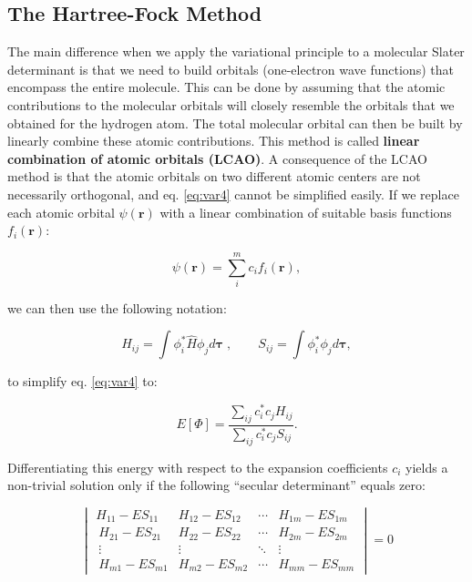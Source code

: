 \documentclass[
  9pt,
]{extbook}
\theoremstyle{definition}
\theoremstyle{definition}
\theoremstyle{definition}
\theoremstyle{remark}
\begin{document}
\hypertarget{the-hartree-fock-method}{%
\subsection{The Hartree-Fock Method}\label{the-hartree-fock-method}}

The main difference when we apply the variational principle to a molecular Slater determinant is that we need to build orbitals (one-electron wave functions) that encompass the entire molecule. This can be done by assuming that the atomic contributions to the molecular orbitals will closely resemble the orbitals that we obtained for the hydrogen atom. The total molecular orbital can then be built by linearly combine these atomic contributions. This method is called \textbf{linear combination of atomic orbitals (LCAO)}. A consequence of the LCAO method is that the atomic orbitals on two different atomic centers are not necessarily orthogonal, and eq. \eqref{eq:var4} cannot be simplified easily. If we replace each atomic orbital \(\psi(\mathbf{r})\) with a linear combination of suitable basis functions \(f_i(\mathbf{r})\):

\begin{equation}
\psi(\mathbf{r}) = \sum_i^m c_{i} f_i(\mathbf{r}),
\label{eq:molham10}
\end{equation}

we can then use the following notation:

\begin{equation}
\displaystyle H_{ij} = \int \phi_i^* {\hat H} \phi_j d\mathbf{\tau}\;, \qquad \displaystyle S_{ij} = \int \phi_i^* \phi_jd\mathbf{\tau},
\label{eq:molham11}
\end{equation}

to simplify eq. \eqref{eq:var4} to:

\begin{equation}
E[\Phi] = \frac{\sum_{ij} c_i^* c_j H_{ij}}{\sum_{ij} c_i^* c_j S_{ij}}.
\label{eq:molham11b}
\end{equation}

Differentiating this energy with respect to the expansion coefficients \(c_i\) yields a non-trivial solution only if the following ``secular determinant'' equals zero:

\begin{equation}
\begin{vmatrix}
H_{11}-ES_{11}   & H_{12}-ES_{12}   & \cdots & H_{1m}-ES_{1m}\\\
H_{21}-ES_{21}   & H_{22}-ES_{22}   & \cdots & H_{2m}-ES_{2m}\\\
\vdots           &   \vdots         & \ddots & \vdots\\\
H_{m1}-ES_{m1}   & H_{m2}-ES_{m2}   & \cdots & H_{mm}-ES_{mm}
\end{vmatrix}=0
\label{eq:molham12}
\end{equation}
\end{document}
